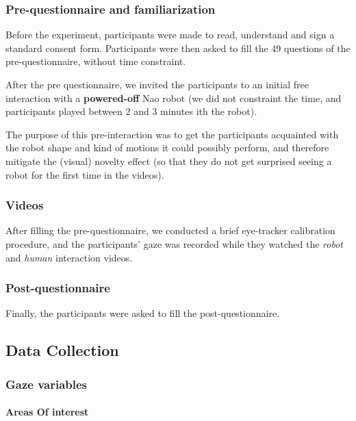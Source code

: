 \documentclass[lettersize, apacite, twoside, HRI]{apa_HRI}
\begin{document}
\subsubsection{Pre-questionnaire and familiarization}

Before the experiment, participants were made to read, understand and sign a
standard consent form. Participants were then asked to fill the 49 questions of
the pre-questionnaire, without time constraint.

After the pre questionnaire, we invited the participants to an initial
free interaction with a \textbf{powered-off} Nao robot (we did not constraint
the time, and participants played between 2 and 3 minutes ith the robot).

The purpose of this pre-interaction was to get the participants acquainted with the
robot shape and kind of motions it could possibly perform, and therefore
mitigate the (visual) novelty effect (so that they do not get surprised seeing
a robot for the first time in the videos).

\subsubsection{Videos}

After filling the pre-questionnaire, we conducted a brief eye-tracker
calibration procedure, and the participants' gaze was recorded while they
watched the \emph{robot} and \emph{human} interaction videos.

\subsubsection{Post-questionnaire}

Finally, the participants were asked to fill the post-questionnaire.

\subsection{Data Collection}

\subsubsection{Gaze variables}

\paragraph{Areas Of interest}
\end{document}
